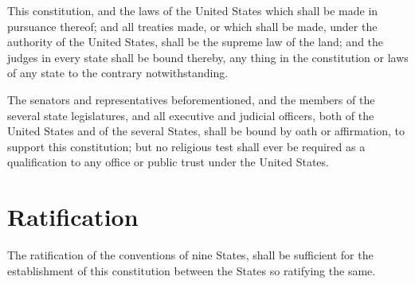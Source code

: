 \documentclass{constitution}
\begin{document}
This constitution, and the laws of the United States which shall be made in pursuance thereof;
and all treaties made, or which shall be made, under the authority of the United States,
shall be the supreme law of the land;
and the judges in every state shall be bound thereby,
any thing in the constitution or laws of any state to the contrary notwithstanding.

The senators and representatives beforementioned,
and the members of the several state legislatures,
and all executive and judicial officers, both of the United States and of the several States,
shall be bound by oath or affirmation, to support this constitution;
but no religious test shall ever be required as a qualification to any office or public trust under the United States.

\chapter{Ratification}
The ratification of the conventions of nine States,
shall be sufficient for the establishment of this constitution between the States so ratifying the same.
\end{document}
